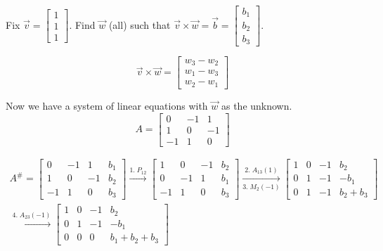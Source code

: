 \documentclass[../main.tex]{subfiles}
\begin{document}
\begin{example}[]
    Fix \( \vec{v} =
    \begin{bmatrix}
        1 \\
        1 \\
        1
    \end{bmatrix} \).
    Find \( \vec{w} \) (all) such that
    \( \vec{v} \times \vec{w} = \vec{b} =
    \begin{bmatrix}
        b_1 \\
        b_2 \\
        b_3
    \end{bmatrix} \).

    \[ \vec{v} \times \vec{w} = \begin{bmatrix}
        w_3 - w_2 \\
        w_1 - w_3 \\
        w_2 - w_1
    \end{bmatrix} \]

    Now we have a system of linear equations with \( \vec{w} \) as the unknown.
    \[ A =
        \begin{bmatrix}
            0 & -1 & 1 \\
            1 & 0 & -1 \\
            -1 & 1 & 0
        \end{bmatrix}
    \]

    \begin{gather*}
        A^\# = 
        \begin{bmatrix}
            0 & -1 & 1 & b_1 \\
            1 & 0 & -1 & b_2 \\
            -1 & 1 & 0 & b_3
        \end{bmatrix}
        \xrightarrow{1. \; P_{12}}
        \begin{bmatrix}
            1 & 0 & -1 & b_2 \\
            0 & -1 & 1 & b_1 \\
            -1 & 1 & 0 & b_3
        \end{bmatrix}
        \xrightarrow[3. \; M_2(-1)]{2. \; A_{13}(1)}
        \begin{bmatrix}
            1 & 0 & -1 & b_2 \\
            0 & 1 & -1 & -b_1 \\
            0 & 1 & -1 & b_2+b_3
        \end{bmatrix} \\
        \xrightarrow{4. \; A_{23}(-1)}
        \begin{bmatrix}
            1 & 0 & -1 & b_2 \\
            0 & 1 & -1 & -b_1 \\
            0 & 0 & 0 & b_1 + b_2 + b_3
        \end{bmatrix}
    \end{gather*}
    

\end{example}
\end{document}

